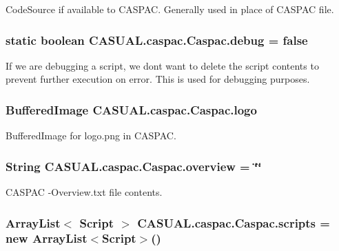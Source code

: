 Code\-Source if available to C\-A\-S\-P\-A\-C. Generally used in place of C\-A\-S\-P\-A\-C file. \hypertarget{class_c_a_s_u_a_l_1_1caspac_1_1_caspac_aa68f7e8ae529dc2f581b4752f7d11830}{
\subsubsection[{debug}]{\setlength{\rightskip}{0pt plus 5cm}static boolean C\-A\-S\-U\-A\-L.\-caspac.\-Caspac.\-debug = false\hspace{0.3cm}{\ttfamily [static]}}}\label{class_c_a_s_u_a_l_1_1caspac_1_1_caspac_aa68f7e8ae529dc2f581b4752f7d11830}
If we are debugging a script, we dont want to delete the script contents to prevent further execution on error. This is used for debugging purposes. \hypertarget{class_c_a_s_u_a_l_1_1caspac_1_1_caspac_abf626c8f6318968578e79d5afb7f8e6c}{
\subsubsection[{logo}]{\setlength{\rightskip}{0pt plus 5cm}Buffered\-Image C\-A\-S\-U\-A\-L.\-caspac.\-Caspac.\-logo}}\label{class_c_a_s_u_a_l_1_1caspac_1_1_caspac_abf626c8f6318968578e79d5afb7f8e6c}
Buffered\-Image for logo.\-png in C\-A\-S\-P\-A\-C. \hypertarget{class_c_a_s_u_a_l_1_1caspac_1_1_caspac_a351355d1da748e296d36bdf891c1b43f}{
\subsubsection[{overview}]{\setlength{\rightskip}{0pt plus 5cm}String C\-A\-S\-U\-A\-L.\-caspac.\-Caspac.\-overview = \char`\"{}\char`\"{}}}\label{class_c_a_s_u_a_l_1_1caspac_1_1_caspac_a351355d1da748e296d36bdf891c1b43f}
C\-A\-S\-P\-A\-C -\/\-Overview.\-txt file contents. \hypertarget{class_c_a_s_u_a_l_1_1caspac_1_1_caspac_a6e7495da998addcff9ffca07f369ccae}{
\subsubsection[{scripts}]{\setlength{\rightskip}{0pt plus 5cm}Array\-List$<$ {\bf Script} $>$ C\-A\-S\-U\-A\-L.\-caspac.\-Caspac.\-scripts = new Array\-List$<${\bf Script}$>$()}}\label{class_c_a_s_u_a_l_1_1caspac_1_1_caspac_a6e7495da998addcff9ffca07f369ccae}
